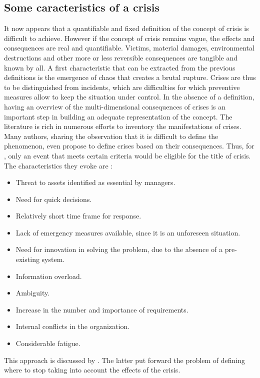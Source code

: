 \subsection{Some caracteristics of a crisis}
It now appears that a quantifiable and fixed definition of the concept of crisis is difficult to achieve.
However if the concept of crisis remains vague, the effects and consequences are real and quantifiable.
Victims, material damages, environmental destructions and other more or less reversible consequences are tangible and known by all.
A first characteristic that can be extracted from the previous definitions is the emergence of chaos that creates a brutal rupture.
Crises are thus to be distinguished from incidents, which are difficulties for which preventive measures allow to keep the situation under control.
In the absence of a definition, having an overview of the multi-dimensional consequences of crises is an important step in building an adequate representation of the concept.
The literature is rich in numerous efforts to inventory the manifestations of crises.
Many authors, sharing the observation that it is difficult to define the phenomenon, even propose to define crises based on their consequences.
Thus, for \cite{milburnManagementCrisis1972}, only an event that meets certain criteria would be eligible for the title of crisis.
The characteristics they evoke are :
\begin{itemize}
    \item Threat to assets identified as essential by managers.
    \item Need for quick decisions.
    \item Relatively short time frame for response.
    \item Lack of emergency measures available, since it is an unforeseen situation.
    \item Need for innovation in solving the problem, due to the absence of a pre-existing system.
    \item Information overload.
    \item Ambiguity.
    \item Increase in the number and importance of requirements.
    \item Internal conflicts in the organization.
    \item Considerable fatigue.
\end{itemize}
This approach is discussed by \cite{rosenthalCrisisDecisionMakingNetherlands1986}.
The latter put forward the problem of defining where to stop taking into account the effects of the crisis.
